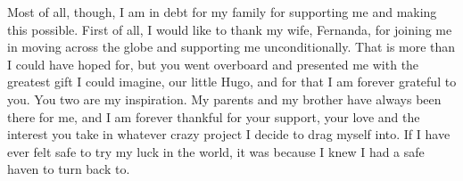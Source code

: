 Most of all, though, I am in debt for my family for supporting me and making this possible. First of all, I would like to thank my wife, Fernanda, for joining me in moving across the globe
and supporting me unconditionally. That is more than I could have hoped for, but you went overboard and presented me with the greatest gift I could imagine, our little Hugo, and
for that I am forever grateful to you. You two are my inspiration. My parents and my brother have always been there for me, and I am forever thankful for your support, your love
and the interest you take in whatever crazy project I decide to drag myself into. If I have ever felt safe to try my luck in the world, it was because I knew I had a safe haven to turn back to.
%
%
%
%
%
%
%
%
